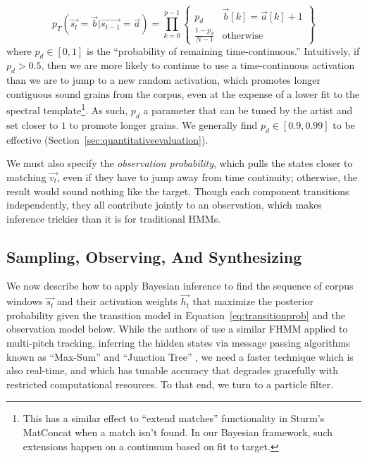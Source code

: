 \documentclass{article}
\begin{document}
    \begin{equation}
        \label{eq:transitionprob}
        p_T(\vec{s_t} = \vec{b} | \vec{s_{t-1}} = \vec{a}) = \prod_{k=0}^{p-1} \left\{  \begin{array}{cc}  p_d & \vec{b}[k] = \vec{a}[k]+1  \\ \frac{1-p_d}{N-1} & \text{otherwise} \end{array} \right\}
    \end{equation}
    where $p_d \in [0, 1]$ is the ``probability of remaining time-continuous.''  Intuitively, if $p_d > 0.5$, then we are more likely to continue to use a time-continuous activation than we are to jump to a new random activation, which promotes longer contiguous sound grains from the corpus, even at the expense of a lower fit to the spectral template\footnote{This has a similar effect to ``extend matches'' functionality in Sturm's MatConcat \cite{sturm2004matconcat} when a match isn't found. In our Bayesian framework, such extensions happen on a continuum based on fit to target.}.  As such, $p_d$ a parameter that can be tuned by the artist and set closer to $1$ to promote longer grains.  We generally find $p_d \in [0.9, 0.99]$ to be effective (Section~\ref{sec:quantitativeevaluation}).

    We must also specify the {\em observation probability}, which pulls the states closer to matching $\vec{v_t}$, even if they have to jump away from time continuity; otherwise, the result would sound nothing like the target.  Though each component transitions independently, they all contribute jointly to an observation, which makes inference trickier than it is for traditional HMMs.



\subsection{Sampling, Observing, And Synthesizing}
\label{sec:sampling}

We now describe how to apply Bayesian inference to find the sequence of corpus windows $\vec{s_t}$ and their activation weights $\vec{h_t}$ that maximize the posterior probability given the transition model in Equation~\ref{eq:transitionprob} and the observation model below.  While the authors of \cite{wohlmayr2010probabilistic} use a similar FHMM applied to multi-pitch tracking, inferring the hidden states via message passing algorithms known as ``Max-Sum'' \cite{kschischang2001factor} and ``Junction Tree'' \cite{jensen1996introduction}, we need a faster technique which is also real-time, and which has tunable accuracy that degrades gracefully with restricted computational resources.  To that end, we turn to a particle filter.
\end{document}
